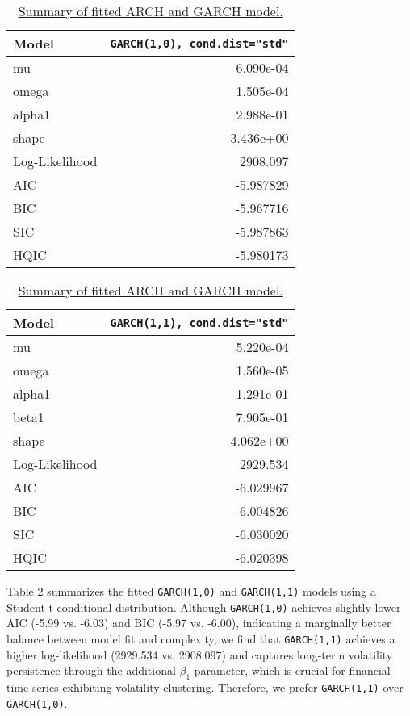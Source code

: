 \documentclass{article}
\newcommand{\1}{\mathbbm{1}}
\theoremstyle{definition}
\begin{document}
\begin{table}[H]
\centering
\begin{minipage}[t]{0.48\textwidth} %
\centering
\scriptsize %
\begin{tabular}{l|r}
\hline
\textbf{Model}  & \texttt{GARCH(1,0), cond.dist="std"} \\
\hline
mu & 6.090e-04\\
omega & 1.505e-04\\
alpha1 & 2.988e-01\\
shape & 3.436e+00\\
\hline
Log-Likelihood  & 2908.097 \\
AIC             & -5.987829 \\
BIC             & -5.967716 \\
SIC             & -5.987863\\
HQIC            & -5.980173\\
\hline
\end{tabular}
\end{minipage}
\hfill
\begin{minipage}[t]{0.48\textwidth} %
\centering
\scriptsize %
\begin{tabular}{l|r}
\hline
\textbf{Model}  & \texttt{GARCH(1,1), cond.dist="std"} \\
\hline
mu              & 5.220e-04\\
omega           & 1.560e-05\\
alpha1          & 1.291e-01\\
beta1           & 7.905e-01\\
shape           & 4.062e+00\\
\hline
Log-Likelihood  & 2929.534 \\
AIC             & -6.029967 \\
BIC             & -6.004826 \\
SIC             & -6.030020\\
HQIC            & -6.020398\\
\hline
\end{tabular}
\end{minipage}
\caption{\small{\href{https://github.com/Stochastic1017/Walmart-Stock-Forecasting/blob/main/R/Fit_ARCH_GARCH.R}{Summary of fitted ARCH and GARCH model.}}}
\label{tab:arch_garch_model_summary}
\end{table}

Table \ref{tab:arch_garch_model_summary} summarizes the fitted \texttt{GARCH(1,0)} and \texttt{GARCH(1,1)} models using a Student-t conditional distribution. Although \texttt{GARCH(1,0)} achieves slightly lower AIC (-5.99 vs. -6.03) and BIC (-5.97 vs. -6.00), indicating a marginally better balance between model fit and complexity, we find that \texttt{GARCH(1,1)} achieves a higher log-likelihood (2929.534 vs. 2908.097) and captures long-term volatility persistence through the additional $\beta_1$ parameter, which is crucial for financial time series exhibiting volatility clustering. Therefore, we prefer \texttt{GARCH(1,1)} over \texttt{GARCH(1,0)}.
\end{document}
